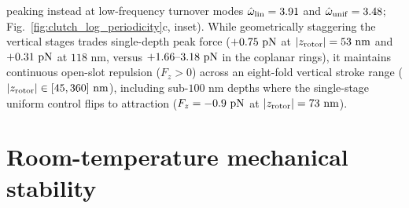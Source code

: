 \documentclass[pdflatex,sn-nature]{sn-jnl}
\DeclareRobustCommand{\roundtwo}[1]{\fpeval{round(#1,2)}}
\begin{document}
peaking instead at low-frequency turnover modes $\hat{\omega}_{\rm lin} = \roundtwo{\LogperFreeOmegaoneLinear}$ and $\hat{\omega}_{\rm unif} = \roundtwo{\LogperFreeOmegaoneUniform}$; Fig.~\ref{fig:clutch_log_periodicity}c, inset). While geometrically staggering the vertical stages trades single-depth peak force ($+\roundtwo{\LogperSteppedRzMaxFzCantorPn}\text{ pN}$ at $|z_{\rm rotor}| = 53\text{ nm}$ and $+\roundtwo{\LogperSteppedRzStagetwoFzCantorPn}\text{ pN}$ at $118\text{ nm}$, versus $+\roundtwo{\CantorNtwoHybridrzBemStdFZPn}\text{--}\roundtwo{\FractalNthreeCantorseventrackBemThetathreeFZPn}\text{ pN}$ in the coplanar rings), it maintains continuous open-slot repulsion ($F_z > 0$) across an eight-fold vertical stroke range ($|z_{\rm rotor}| \in [45, 360]\text{ nm}$), including sub-$100\text{ nm}$ depths where the single-stage uniform control flips to attraction ($F_z = \roundtwo{\LogperSteppedRzMinFzUniformPn}\text{ pN}$ at $|z_{\rm rotor}| = 73\text{ nm}$).

\section*{Room-temperature mechanical stability}
\label{sec:experimental}
\end{document}
